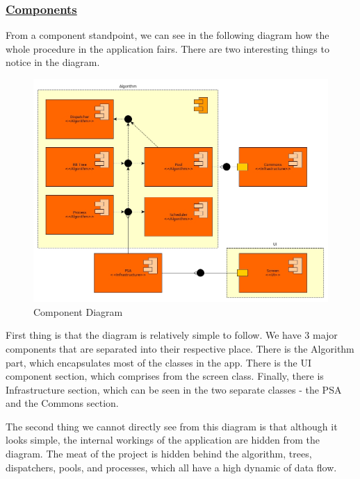 \documentclass{article}
\begin{document}
\subsubsection{\underline{Components}}

From a component standpoint, we can see in the following diagram how the whole procedure in the application fairs. There are two interesting things to notice in the diagram.

\begin{figure}[H]
  \centering
  \includegraphics[width=\linewidth]{./pics/component.jpg}
  \caption{Component Diagram}
  \label{fig:Component Diagram}
\end{figure}

First thing is that the diagram is relatively simple to follow. We have 3 major components that are separated into their respective place. There is the Algorithm part, which encapsulates most of the classes in the app. There is the UI component section, which comprises from the screen class. Finally, there is Infrastructure section, which can be seen in the two separate classes - the PSA and the Commons section.

The second thing we cannot directly see from this diagram is that although it looks simple, the internal workings of the application are hidden from the diagram. The meat of the project is hidden behind the algorithm, trees, dispatchers, pools, and processes, which all have a high dynamic of data flow.
\end{document}
